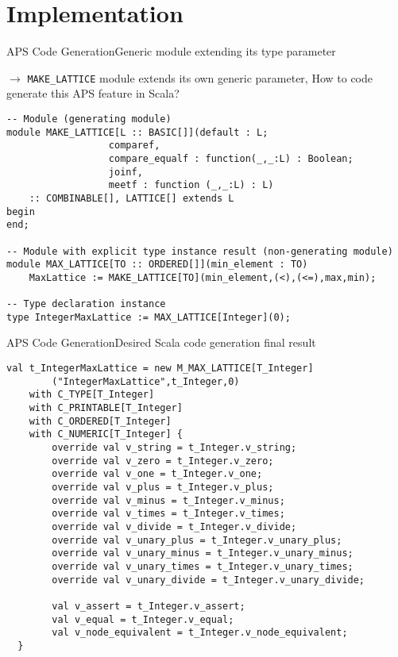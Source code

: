 \section{Implementation}

\begin{frame}[fragile=singleslide]{APS Code Generation}{Generic module extending its type parameter}

{ \small $\to$ \texttt{MAKE\_LATTICE} module \alert{extends its own generic parameter}, How to code generate this APS feature in \alert{Scala}? }

\newlinevspace

\begin{Verbatim}[fontsize=\tiny]
-- Module (generating module)
module MAKE_LATTICE[L :: BASIC[]](default : L;
				  comparef,
				  compare_equalf : function(_,_:L) : Boolean;
				  joinf,
				  meetf : function (_,_:L) : L)
    :: COMBINABLE[], LATTICE[] extends L
begin
end;

-- Module with explicit type instance result (non-generating module)
module MAX_LATTICE[TO :: ORDERED[]](min_element : TO)
    MaxLattice := MAKE_LATTICE[TO](min_element,(<),(<=),max,min);

-- Type declaration instance
type IntegerMaxLattice := MAX_LATTICE[Integer](0);
\end{Verbatim}

\end{frame}

\begin{frame}[fragile=singleslide]{APS Code Generation}{Desired Scala code generation final result}


\begin{Verbatim}[fontsize=\tiny]
val t_IntegerMaxLattice = new M_MAX_LATTICE[T_Integer]
        ("IntegerMaxLattice",t_Integer,0)
    with C_TYPE[T_Integer]
    with C_PRINTABLE[T_Integer]
    with C_ORDERED[T_Integer]
    with C_NUMERIC[T_Integer] {
        override val v_string = t_Integer.v_string;
        override val v_zero = t_Integer.v_zero;
        override val v_one = t_Integer.v_one;
        override val v_plus = t_Integer.v_plus;
        override val v_minus = t_Integer.v_minus;
        override val v_times = t_Integer.v_times;
        override val v_divide = t_Integer.v_divide;
        override val v_unary_plus = t_Integer.v_unary_plus;
        override val v_unary_minus = t_Integer.v_unary_minus;
        override val v_unary_times = t_Integer.v_unary_times;
        override val v_unary_divide = t_Integer.v_unary_divide;
        
        val v_assert = t_Integer.v_assert;
        val v_equal = t_Integer.v_equal;
        val v_node_equivalent = t_Integer.v_node_equivalent;
  }
\end{Verbatim}

\end{frame}

